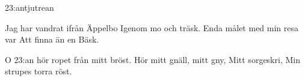 \begin{song}{23:an}{tjutrean}
\begin{vers}
Jag har vandrat ifrån Äppelbo
Igenom mo och träsk.
Enda målet med min resa var
Att finna än en Bäsk.
\end{vers}
\begin{vers}
O 23:an hör ropet från mitt bröst.
Hör mitt gnäll, mitt gny,
Mitt sorgeskri,
Min strupes torra röst.
\end{vers}
\end{song}
